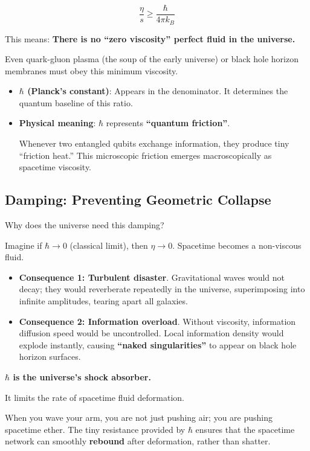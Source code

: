\[\frac{\eta}{s} \ge \frac{\hbar}{4\pi k_B}\]

This means: \textbf{There is no ``zero viscosity'' perfect fluid in the universe.}

Even quark-gluon plasma (the soup of the early universe) or black hole horizon membranes must obey this minimum viscosity.

\begin{itemize}
\item \textbf{$\hbar$ (Planck's constant)}: Appears in the denominator. It determines the quantum baseline of this ratio.

\item \textbf{Physical meaning}: $\hbar$ represents \textbf{``quantum friction''}.

Whenever two entangled qubits exchange information, they produce tiny ``friction heat.'' This microscopic friction emerges macroscopically as spacetime viscosity.
\end{itemize}

\subsection{Damping: Preventing Geometric Collapse}

Why does the universe need this damping?

Imagine if $\hbar \to 0$ (classical limit), then $\eta \to 0$. Spacetime becomes a non-viscous fluid.

\begin{itemize}
\item \textbf{Consequence 1: Turbulent disaster}. Gravitational waves would not decay; they would reverberate repeatedly in the universe, superimposing into infinite amplitudes, tearing apart all galaxies.

\item \textbf{Consequence 2: Information overload}. Without viscosity, information diffusion speed would be uncontrolled. Local information density would explode instantly, causing \textbf{``naked singularities''} to appear on black hole horizon surfaces.
\end{itemize}

\textbf{$\hbar$ is the universe's shock absorber.}

It limits the rate of spacetime fluid deformation.

When you wave your arm, you are not just pushing air; you are pushing spacetime ether. The tiny resistance provided by $\hbar$ ensures that the spacetime network can smoothly \textbf{rebound} after deformation, rather than shatter.

